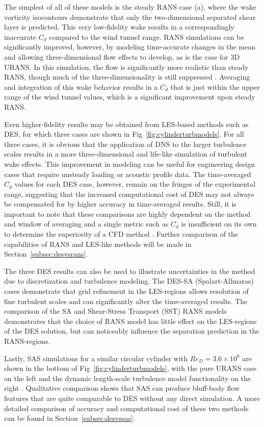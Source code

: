 \documentclass[journal]{new-aiaa}
\begin{document}
The simplest of all of these models is the steady RANS case (a), where the wake vorticity isocontours demonstrate that only the two-dimensional separated shear layer is predicted. This very low-fidelity wake results in a correspondingly inaccurate $C_d$ compared to the wind tunnel range. RANS simulations can be significantly improved, however, by modeling time-accurate changes in the mean and allowing three-dimensional flow effects to develop, as is the case for 3D URANS.  In this simulation, the flow is significantly more realistic than steady RANS, though much of the three-dimensionality is still suppressed \cite{spalart2009detachededdy}.  Averaging and integration of this wake behavior results in a $C_d$ that is just within the upper range of the wind tunnel values, which is a significant improvement upon steady RANS.

Even higher-fidelity results may be obtained from LES-based methods such as DES, for which three cases are shown in Fig~\ref{fig:cylinderturbmodels}. For all three cases, it is obvious that the application of DNS to the larger turbulence scales results in a more three-dimensional and life-like simulation of turbulent wake effects. This improvement in modeling can be useful for engineering design cases that require unsteady loading or acoustic profile data. The time-averaged $C_d$ values for each DES case, however, remain on the fringes of the experimental range, suggesting that the increased computational cost of DES may not always be compensated for by higher accuracy in time-averaged results. Still, it is important to note that these comparisons are highly dependent on the method and window of averaging and a single metric such as $C_d$ is insufficient on its own to determine the superiority of a CFD method \cite{travin2000detachededdy}. Further comparison of the capabilities of RANS and LES-like methods will be made in Section~\ref{subsec:desvsrans}.

The three DES results can also be used to illustrate uncertainties in the method due to discretization and turbulence modeling. The DES-SA (Spalart-Allmaras) cases demonstrate that grid refinement in the LES-regions allows resolution of fine turbulent scales and can significantly alter the time-averaged results. The comparison of the SA and Shear-Stress Transport (SST) RANS models demonstrates that the choice of RANS model has little effect on the LES-regions of the DES solution, but can noticeably influence the separation prediction in the RANS-regions.

Lastly, SAS simulations for a similar circular cylinder with $Re_D=3.6 \times 10^6$ are shown in the bottom of Fig~\ref{fig:cylinderturbmodels}, with the pure URANS case on the left and the dynamic length-scale turbulence model functionality on the right \cite{menter2005scaleadaptive}. Qualitative comparison shows that SAS can produce bluff-body flow features that are quite comparable to DES without any direct simulation. A more detailed comparison of accuracy and computational cost of these two methods can be found in Section~\ref{subsec:desvssas}.
\end{document}

